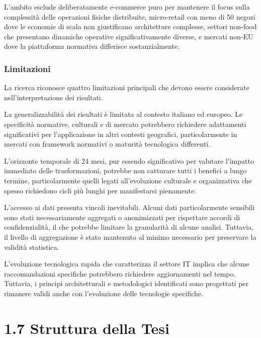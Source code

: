 \documentclass[12pt,a4paper,oneside]{book}
\begin{document}
L'ambito esclude deliberatamente e-commerce puro per mantenere il focus sulla complessità delle operazioni fisiche distribuite, micro-retail con meno di 50 negozi dove le economie di scala non giustificano architetture complesse, settori non-food che presentano dinamiche operative significativamente diverse, e mercati non-EU dove la piattaforma normativa differisce sostanzialmente.

\subsubsection{\texorpdfstring{\textbf{
Limitazioni}}{1.6.2 Limitazioni}}\label{limitazioni}

La ricerca riconosce quattro limitazioni principali che devono essere
considerate nell'interpretazione dei risultati.

La generalizzabilità dei risultati è limitata al contesto italiano ed
europeo. Le specificità normative, culturali e di mercato potrebbero
richiedere adattamenti significativi per l'applicazione in altri
contesti geografici, particolarmente in mercati con framework normativi
o maturità tecnologica differenti.

L'orizzonte temporale di 24 mesi, pur essendo significativo per valutare
l'impatto immediato delle trasformazioni, potrebbe non catturare tutti i
benefici a lungo termine, particolarmente quelli legati all'evoluzione
culturale e organizzativa che spesso richiedono cicli più lunghi per
manifestarsi pienamente.

L'accesso ai dati presenta vincoli inevitabili. Alcuni dati
particolarmente sensibili sono stati necessariamente aggregati o
anonimizzati per rispettare accordi di confidenzialità, il che potrebbe
limitare la granularità di alcune analisi. Tuttavia, il livello di
aggregazione è stato mantenuto al minimo necessario per preservare la
validità statistica.

L'evoluzione tecnologica rapida che caratterizza il settore IT implica
che alcune raccomandazioni specifiche potrebbero richiedere
aggiornamenti nel tempo. Tuttavia, i principi architetturali e
metodologici identificati sono progettati per rimanere validi anche con
l'evoluzione delle tecnologie specifiche.

\section{\texorpdfstring{\textbf{1.7 Struttura della
Tesi}}{1.7 Struttura della Tesi}}\label{struttura-della-tesi}
\end{document}
